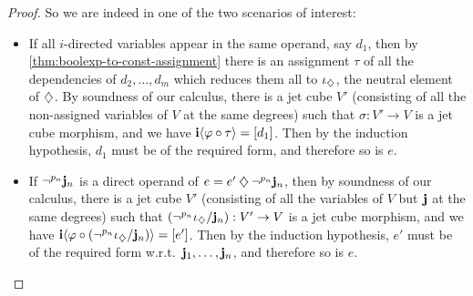 \documentclass[a4paper]{memoir}
\begin{document}
\begin{proof}
	So we are indeed in one of the two scenarios of interest:
	\begin{itemize}
		\item If all $i$-directed variables appear in the same operand, say $d_1$, then by \cref{thm:boolexp-to-const-assignment} there is an assignment $\tau$ of all the dependencies of $d_2, \ldots, d_m$ which reduces them all to $\iota_{\mathbin{\diamondsuit}}$, the neutral element of $\mathbin{\diamondsuit}$.
		By soundness of our calculus, there is a jet cube $V'$ (consisting of all the non-assigned variables of $V$ at the same degrees) such that $\sigma : V' \to V$ is a jet cube morphism, and we have $\mathbf{i} \langle \varphi \circ \tau \rangle = [d_1]$.
		Then by the induction hypothesis, $d_1$ must be of the required form, and therefore so is $e$.
		\item If $\lnot^{p_n} \mathbf{j}_n$ is a direct operand of $e = e' \mathbin{\diamondsuit} \lnot^{p_n} \mathbf{j}_n$, then by soundness of our calculus, there is a jet cube $V'$ (consisting of all the variables of $V$ but $\mathbf{j}$ at the same degrees) such that $(\lnot^{p_n} \iota_{\mathbin{\diamondsuit}} / \mathbf{j}_n) : V' \to V$ is a jet cube morphism, and we have $\mathbf{i} \langle \varphi \circ (\lnot^{p_n}\iota_{\mathbin{\diamondsuit}} / \mathbf{j}_n) \rangle = [e']$.
		Then by the induction hypothesis, $e'$ must be of the required form w.r.t.\ $\mathbf{j}_1, \ldots, \mathbf{j}_n$, and therefore so is $e$. \qedhere
	\end{itemize}
%	
%	
%	
%	
%	
%		

\end{proof}
\end{document}
